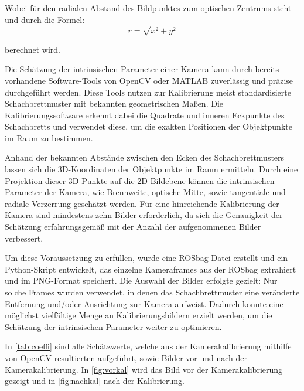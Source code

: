 \documentclass[ngerman]{article}    %
\theoremstyle{definition}
\begin{document}
Wobei  für den radialen Abstand des Bildpunktes zum optischen Zentrums steht und durch die Formel:
\begin{equation}
    r = \sqrt{x^2 + y^2}
\end{equation}

berechnet wird. 



Die Schätzung der intrinsischen Parameter einer Kamera kann durch bereits vorhandene Software-Tools von OpenCV oder MATLAB zuverlässig und präzise durchgeführt werden. Diese Tools nutzen zur Kalibrierung meist standardisierte Schachbrettmuster mit bekannten geometrischen Maßen. Die Kalibrierungssoftware erkennt dabei die Quadrate und inneren Eckpunkte des Schachbretts und verwendet diese, um die exakten Positionen der Objektpunkte im Raum zu bestimmen.

Anhand der bekannten Abstände zwischen den Ecken des Schachbrettmusters lassen sich die 3D-Koordinaten der Objektpunkte im Raum ermitteln. Durch eine Projektion dieser 3D-Punkte auf die 2D-Bildebene können die intrinsischen Parameter der Kamera, wie Brennweite, optische Mitte, sowie tangentiale und radiale Verzerrung geschätzt werden. Für eine hinreichende Kalibrierung der Kamera sind mindestens zehn Bilder erforderlich, da sich die Genauigkeit der Schätzung erfahrungsgemäß mit der Anzahl der aufgenommenen Bilder verbessert.

Um diese Voraussetzung zu erfüllen, wurde eine ROSbag-Datei erstellt und ein Python-Skript entwickelt, das einzelne Kameraframes aus der ROSbag extrahiert und im PNG-Format speichert. Die Auswahl der Bilder erfolgte gezielt: Nur solche Frames wurden verwendet, in denen das Schachbrettmuster eine veränderte Entfernung und/oder Ausrichtung zur Kamera aufweist. Dadurch konnte eine möglichst vielfältige Menge an Kalibrierungsbildern erzielt werden, um die Schätzung der intrinsischen Parameter weiter zu optimieren.


\newpage

In \autoref{tab:coeffi} sind alle Schätzwerte, welche aus der Kamerakalibrierung mithilfe von OpenCV resultierten aufgeführt, sowie Bilder vor und nach der Kamerakalibrierung. In \autoref{fig:vorkal} wird das Bild vor der Kamerakalibrierung gezeigt und in \autoref{fig:nachkal} nach der Kalibrierung. \\
\end{document}
